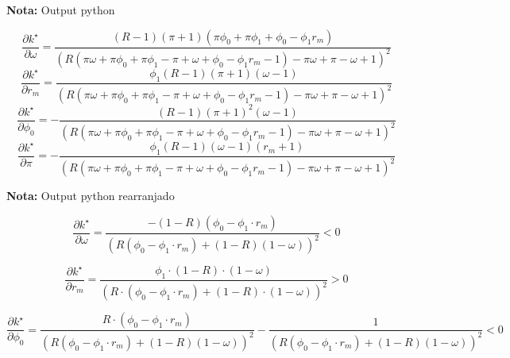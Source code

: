 \documentclass[11pt]{article}
\begin{document}
\textbf{Nota:} Output python

\begin{equation}\frac{\partial k^{\star}}{\partial \omega} = \frac{\left(R - 1\right) \left(\pi + 1\right) \left(\pi \phi_{0} + \pi \phi_{1} + \phi_{0} - \phi_{1} r_{m}\right)}{\left(R \left(\pi \omega + \pi \phi_{0} + \pi \phi_{1} - \pi + \omega + \phi_{0} - \phi_{1} r_{m} - 1\right) - \pi \omega + \pi - \omega + 1\right)^{2}}\end{equation}
\begin{equation}\frac{\partial k^{\star}}{\partial r_{m}} = \frac{\phi_{1} \left(R - 1\right) \left(\pi + 1\right) \left(\omega - 1\right)}{\left(R \left(\pi \omega + \pi \phi_{0} + \pi \phi_{1} - \pi + \omega + \phi_{0} - \phi_{1} r_{m} - 1\right) - \pi \omega + \pi - \omega + 1\right)^{2}}\end{equation}
\begin{equation}\frac{\partial k^{\star}}{\partial \phi_{0}} = - \frac{\left(R - 1\right) \left(\pi + 1\right)^{2} \left(\omega - 1\right)}{\left(R \left(\pi \omega + \pi \phi_{0} + \pi \phi_{1} - \pi + \omega + \phi_{0} - \phi_{1} r_{m} - 1\right) - \pi \omega + \pi - \omega + 1\right)^{2}}\end{equation}
\begin{equation}\frac{\partial k^{\star}}{\partial \pi} = - \frac{\phi_{1} \left(R - 1\right) \left(\omega - 1\right) \left(r_{m} + 1\right)}{\left(R \left(\pi \omega + \pi \phi_{0} + \pi \phi_{1} - \pi + \omega + \phi_{0} - \phi_{1} r_{m} - 1\right) - \pi \omega + \pi - \omega + 1\right)^{2}}\end{equation}


\textbf{Nota:} Output python rearranjado

\begin{equation}
\frac{\partial k^{\star}}{\partial \omega} = \frac{-(1-R)(\phi_0 - \phi_1\cdot r_m)}{(R(\phi_0 - \phi_1\cdot r_m) + (1-R)(1-\omega))^2} < 0
\end{equation}

\begin{equation}
\frac{\partial k^{\star}}{\partial r_{m}} = \frac{\phi_1\cdot(1-R)\cdot(1-\omega)}{(R\cdot (\phi_0 - \phi_1\cdot r_m) + (1-R)\cdot (1-\omega))^2} > 0
\end{equation}

\begin{equation}
\frac{\partial k^{\star}}{\partial \phi_0} = 
 \frac{R\cdot(\phi_0 - \phi_1\cdot r_m)}{(R(\phi_0 - \phi_1\cdot r_m) + (1-R)(1-\omega))^2} - \frac{1}{(R(\phi_0 - \phi_1\cdot r_m) + (1-R)(1-\omega))^2} < 0
\end{equation}
\end{document}
